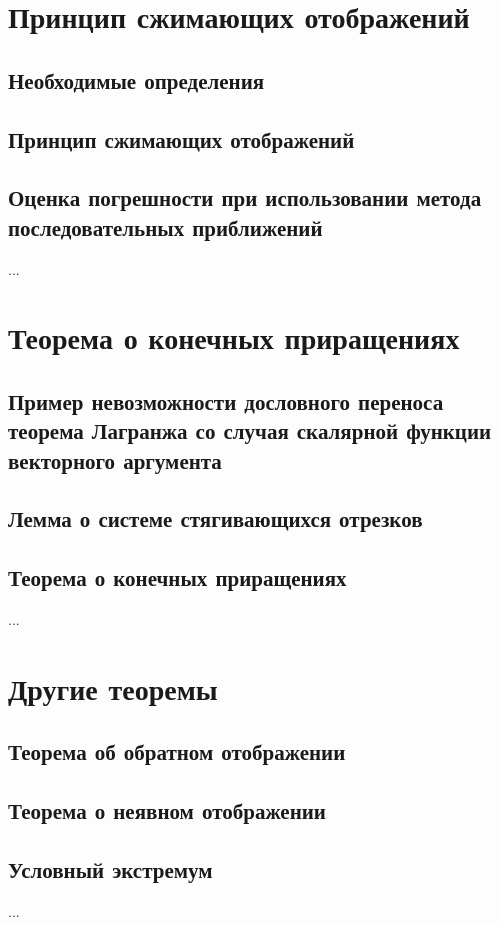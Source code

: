 \section{Принцип сжимающих отображений}
\subsection{Необходимые определения}
\subsection{Принцип сжимающих отображений}
\subsection{Оценка погрешности при использовании метода последовательных приближений}
...

\section{Теорема о конечных приращениях}
\subsection{Пример невозможности дословного переноса теорема Лагранжа со случая скалярной функции векторного аргумента}

\subsection{Лемма о системе стягивающихся отрезков}
\subsection{Теорема о конечных приращениях}
...

\section{Другие теоремы}
\subsection{Теорема об обратном отображении}
\subsection{Теорема о неявном отображении}
\subsection{Условный экстремум}
...
